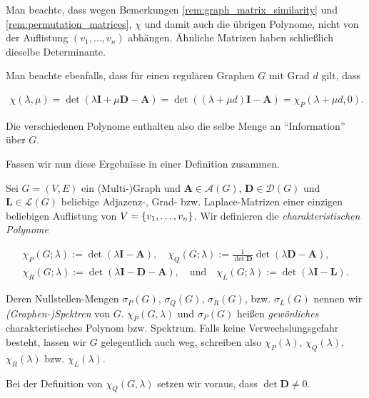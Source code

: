 \begin{remark}
            Man beachte, dass wegen Bemerkungen \ref{rem:graph_matrix_similarity} und \ref{rem:permutation_matrices}, $\chi$ und damit auch die übrigen Polynome, nicht von der Auflistung $(v_1, \dots, v_n)$ abhängen.
            Ähnliche Matrizen haben schließlich dieselbe Determinante.

            Man beachte ebenfalls, dass für einen regulären Graphen $G$ mit Grad $d$ gilt, dass

            \begin{align*}
                \chi(\lambda, \mu)
                =
                \det(\lambda \mathbf I + \mu \mathbf D - \mathbf A)
                =
                \det((\lambda + \mu d) \mathbf I - \mathbf A)
                =
                \chi_P(\lambda + \mu d, 0).
            \end{align*}

            Die verschiedenen Polynome enthalten also die selbe Menge an \enquote{Information} über $G$.

        \end{remark}

        Fassen wir nun diese Ergebnisse in einer Definition zusammen.

        \begin{definition} \label{def:graph_characteristic_polynomials_and_spectra}

            Sei $G = (V, E)$ ein (Multi-)Graph und $\mathbf A \in \mathcal A(G)$, $\mathbf D \in \mathcal D(G)$ und $\mathbf L \in \mathcal L(G)$ beliebige Adjazenz-, Grad- bzw. Laplace-Matrizen einer einzigen beliebigen Auflistung von $V = {\left \{ v_1, \dots, v_n \right \}}$.
            Wir definieren die \textit{charakteristischen Polynome}

            \begin{gather*}
                \chi_P(G; \lambda) := \det(\lambda \mathbf I - \mathbf A),
                \quad
                \chi_Q(G; \lambda) := \frac{1}{\det \mathbf D} \det(\lambda \mathbf D - \mathbf A), \\
                \chi_R(G; \lambda) := \det(\lambda \mathbf I - \mathbf D - \mathbf A),
                \quad
                \text{und}
                \quad
                \chi_L(G; \lambda) := \det(\lambda \mathbf I - \mathbf L).
            \end{gather*}

            Deren Nullstellen-Mengen $\sigma_P(G)$, $\sigma_Q(G)$, $\sigma_R(G)$, bzw. $\sigma_L(G)$ nennen wir \textit{(Graphen-)Spektren} von $G$.
            $\chi_P(G, \lambda)$ und $\sigma_P(G)$ heißen \textit{gewönliches} charakteristisches Polynom bzw. Spektrum.
            Falls keine Verwechslungsgefahr besteht, lassen wir $G$ gelegentlich auch weg, schreiben also $\chi_P(\lambda)$, $\chi_Q(\lambda)$, $\chi_R(\lambda)$ bzw. $\chi_L(\lambda)$.

            Bei der Definition von $\chi_Q(G, \lambda)$ setzen wir voraus, dass $\det \mathbf D \neq 0$.

        \end{definition}
